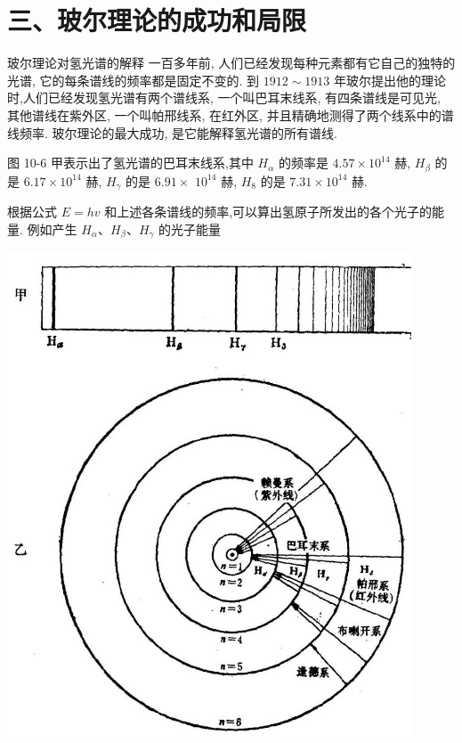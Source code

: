 \documentclass[10pt]{article}
\begin{document}
\section*{三、玻尔理论的成功和局限}

玻尔理论对氢光谱的解释 一百多年前, 人们已经发现每种元素都有它自己的独特的光谱, 它的每条谱线的频率都是固定不变的. 到 \({1912} \sim {1913}\) 年玻尔提出他的理论时,人们已经发现氢光谱有两个谱线系, 一个叫巴耳末线系, 有四条谱线是可见光, 其他谱线在紫外区, 一个叫帕邢线系, 在红外区, 并且精确地测得了两个线系中的谱线频率. 玻尔理论的最大成功, 是它能解释氢光谱的所有谱线.

图 10-6 甲表示出了氢光谱的巴耳末线系,其中 \({H}_{\alpha }\) 的频率是 \({4.57} \times {10}^{14}\) 赫, \({H}_{\beta }\) 的是 \({6.17} \times {10}^{14}\) 赫, \({H}_{\gamma }\) 的是 \({6.91} \times\) \({10}^{14}\) 赫, \({H}_{8}\) 的是 \({7.31} \times {10}^{14}\) 赫.

根据公式 \(E = {hv}\) 和上述各条谱线的频率,可以算出氢原子所发出的各个光子的能量. 例如产生 \({H}_{\alpha }\text{、}{H}_{\beta }\text{、}{H}_{\gamma }\) 的光子能量

\begin{center}
\includegraphics[max width=0.9\textwidth]{images/01913056-1f15-74d8-9184-9aab52c9d66b_335_287404.jpg}
\end{center}
\end{document}
